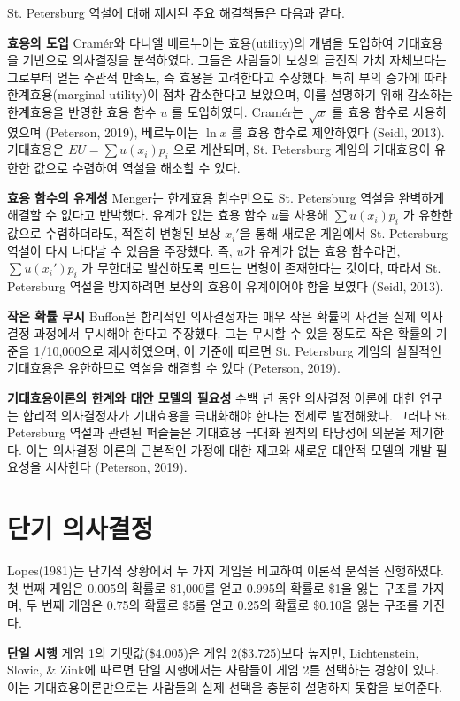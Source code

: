 St. Petersburg 역설에 대해 제시된 주요 해결책들은 다음과 같다.

\textbf{효용의 도입} Cramér와 다니엘 베르누이는 효용(utility)의 개념을 도입하여 기대효용을 기반으로 의사결정을 분석하였다. 그들은 사람들이 보상의 금전적 가치 자체보다는 그로부터 얻는 주관적 만족도, 즉 효용을 고려한다고 주장했다. 특히 부의 증가에 따라 한계효용(marginal utility)이 점차 감소한다고 보았으며, 이를 설명하기 위해 감소하는 한계효용을 반영한 효용 함수 $u$ 를 도입하였다. Cramér는 $\sqrt x$ 를 효용 함수로 사용하였으며 (Peterson, 2019), 베르누이는 $\ln x$ 를 효용 함수로 제안하였다 (Seidl, 2013). 기대효용은 $EU=\sum u(x_i)p_i$ 으로 계산되며, St. Petersburg 게임의 기대효용이 유한한 값으로 수렴하여 역설을 해소할 수 있다.

\textbf{효용 함수의 유계성} Menger는 한계효용 함수만으로 St. Petersburg 역설을 완벽하게 해결할 수 없다고 반박했다. 유계가 없는 효용 함수 $u$를 사용해 $\sum u(x_i)p_i$ 가 유한한 값으로 수렴하더라도, 적절히 변형된 보상 $x_i'$을 통해 새로운 게임에서 St. Petersburg 역설이 다시 나타날 수 있음을 주장했다. 즉, $u$가 유계가 없는 효용 함수라면, $\sum u(x_i')p_i$ 가 무한대로 발산하도록 만드는 변형이 존재한다는 것이다, 따라서 St. Petersburg 역설을 방지하려면 보상의 효용이 유계이어야 함을 보였다 (Seidl, 2013).

\textbf{작은 확률 무시} Buffon은 합리적인 의사결정자는 매우 작은 확률의 사건을 실제 의사결정 과정에서 무시해야 한다고 주장했다. 그는 무시할 수 있을 정도로 작은 확률의 기준을 1/10,000으로 제시하였으며, 이 기준에 따르면 St. Petersburg 게임의 실질적인 기대효용은 유한하므로 역설을 해결할 수 있다 (Peterson, 2019).

\textbf{기대효용이론의 한계와 대안 모델의 필요성} 수백 년 동안 의사결정 이론에 대한 연구는 합리적 의사결정자가 기대효용을 극대화해야 한다는 전제로 발전해왔다. 그러나 St. Petersburg 역설과 관련된 퍼즐들은 기대효용 극대화 원칙의 타당성에 의문을 제기한다. 이는 의사결정 이론의 근본적인 가정에 대한 재고와 새로운 대안적 모델의 개발 필요성을 시사한다 (Peterson, 2019).


\section{단기 의사결정}

Lopes(1981)는 단기적 상황에서 두 가지 게임을 비교하여 이론적 분석을 진행하였다. 첫 번째 게임은 0.005의 확률로 \$1,000를 얻고 0.995의 확률로 \$1을 잃는 구조를 가지며, 두 번째 게임은 0.75의 확률로 \$5를 얻고 0.25의 확률로 \$0.10을 잃는 구조를 가진다.

\textbf{단일 시행} 게임 1의 기댓값(\$4.005)은 게임 2(\$3.725)보다 높지만, Lichtenstein, Slovic, \& Zink에 따르면 단일 시행에서는 사람들이 게임 2를 선택하는 경향이 있다. 이는 기대효용이론만으로는 사람들의 실제 선택을 충분히 설명하지 못함을 보여준다.

